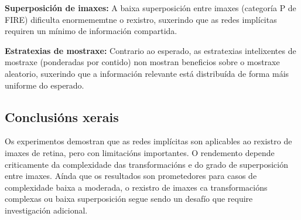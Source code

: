 \textbf{Superposición de imaxes:} A baixa superposición entre imaxes (categoría P de FIRE) dificulta enormememtne o rexistro, suxerindo que as redes implícitas requiren un mínimo de información compartida.

\textbf{Estratexias de mostraxe:} Contrario ao esperado, as estratexias intelixentes de mostraxe (ponderadas por contido) non mostran beneficios sobre o mostraxe aleatorio, suxerindo que a información relevante está distribuída de forma máis uniforme do esperado.

\subsection{Conclusións xerais}
\label{subsec:Conclusións xerais}

Os experimentos demostran que as redes implícitas son aplicables ao rexistro de imaxes de retina, pero con limitacións importantes. O rendemento depende criticamente da complexidade das transformacións e do grado de superposición entre imaxes. Aínda que os resultados son prometedores para casos de complexidade baixa a moderada, o rexistro de imaxes ca transformacións complexas ou baixa superposición segue sendo un desafío que require investigación adicional.
